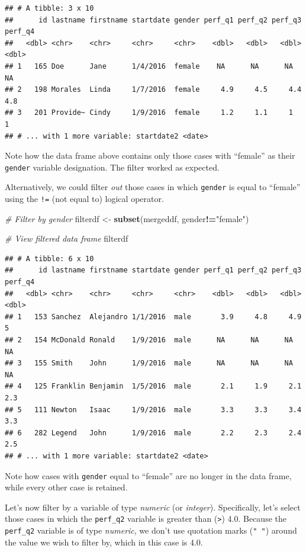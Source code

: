 \documentclass[]{book}
\newenvironment{Shaded}{\begin{snugshade}}{\end{snugshade}}
\newcommand{\KeywordTok}[1]{\textcolor[rgb]{0.13,0.29,0.53}{\textbf{#1}}}
\newcommand{\StringTok}[1]{\textcolor[rgb]{0.31,0.60,0.02}{#1}}
\newcommand{\CommentTok}[1]{\textcolor[rgb]{0.56,0.35,0.01}{\textit{#1}}}
\newcommand{\OperatorTok}[1]{\textcolor[rgb]{0.81,0.36,0.00}{\textbf{#1}}}
\newcommand{\NormalTok}[1]{#1}
\begin{document}
\begin{verbatim}
## # A tibble: 3 x 10
##      id lastname firstname startdate gender perf_q1 perf_q2 perf_q3 perf_q4
##   <dbl> <chr>    <chr>     <chr>     <chr>    <dbl>   <dbl>   <dbl>   <dbl>
## 1   165 Doe      Jane      1/4/2016  female    NA      NA      NA      NA  
## 2   198 Morales  Linda     1/7/2016  female     4.9     4.5     4.4     4.8
## 3   201 Provide~ Cindy     1/9/2016  female     1.2     1.1     1       1  
## # ... with 1 more variable: startdate2 <date>
\end{verbatim}

Note how the data frame above contains only those cases with ``female''
as their \texttt{gender} variable designation. The filter worked as
expected.

Alternatively, we could filter \emph{out} those cases in which
\texttt{gender} is equal to ``female'' using the \texttt{!=} (not equal
to) logical operator.

\begin{Shaded}
\begin{Highlighting}[]
\CommentTok{# Filter by gender}
\NormalTok{filterdf <-}\StringTok{ }\KeywordTok{subset}\NormalTok{(mergeddf, gender}\OperatorTok{!=}\StringTok{"female"}\NormalTok{)}

\CommentTok{# View filtered data frame}
\NormalTok{filterdf}
\end{Highlighting}
\end{Shaded}

\begin{verbatim}
## # A tibble: 6 x 10
##      id lastname firstname startdate gender perf_q1 perf_q2 perf_q3 perf_q4
##   <dbl> <chr>    <chr>     <chr>     <chr>    <dbl>   <dbl>   <dbl>   <dbl>
## 1   153 Sanchez  Alejandro 1/1/2016  male       3.9     4.8     4.9     5  
## 2   154 McDonald Ronald    1/9/2016  male      NA      NA      NA      NA  
## 3   155 Smith    John      1/9/2016  male      NA      NA      NA      NA  
## 4   125 Franklin Benjamin  1/5/2016  male       2.1     1.9     2.1     2.3
## 5   111 Newton   Isaac     1/9/2016  male       3.3     3.3     3.4     3.3
## 6   282 Legend   John      1/9/2016  male       2.2     2.3     2.4     2.5
## # ... with 1 more variable: startdate2 <date>
\end{verbatim}

Note how cases with \texttt{gender} equal to ``female'' are no longer in
the data frame, while every other case is retained.

Let's now filter by a variable of type \emph{numeric} (or
\emph{integer}). Specifically, let's select those cases in which the
\texttt{perf\_q2} variable is greater than (\texttt{\textgreater{}})
4.0. Because the \texttt{perf\_q2} variable is of type \emph{numeric},
we don't use quotation marks (\texttt{"\ "}) around the value we wish to
filter by, which in this case is 4.0.
\end{document}
